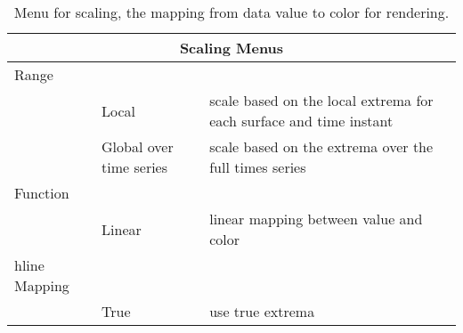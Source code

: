 \begin{table}[ht]
  \begin{center}
    \begin{tabular}{|l|l|p{3 in}|} \hline
      \multicolumn{3}{|c|}{Scaling Menus} \\ \hline
    Range & & \\
    &  Local  & scale based on the local extrema for each surface and time
       instant \\
    &  Global over time series  & scale based on the extrema over the full
        times series \\ \hline
    Function & & \\
    &  Linear & linear mapping between value and color \\ hline
    Mapping & & \\
    &  True & use true extrema \\ 
\hline
    \end{tabular}
  \end{center}
\caption{Menu for scaling, the mapping from data value to color for
rendering. }
\label{table:scaling}
\end{table}


